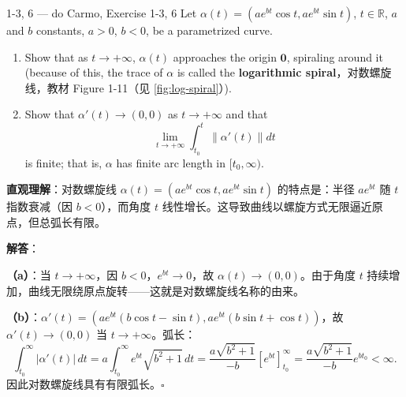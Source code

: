 \begin{exercise}{1-3, 6 — do Carmo, Exercise 1-3, 6}
Let $\alpha(t) = (ae^{bt}\cos t, ae^{bt}\sin t)$, $t \in \mathbb{R}$, $a$ and $b$ constants, $a > 0$, $b < 0$, be a parametrized curve.
\begin{enumerate}
\item[a.] Show that as $t \to +\infty$, $\alpha(t)$ approaches the origin $\mathbf{0}$, spiraling around it (because of this, the trace of $\alpha$ is called the \textbf{logarithmic spiral}，对数螺旋线，教材 Figure 1-11（见 \cref{fig:log-spiral}）).
\item[b.] Show that $\alpha'(t) \to (0,0)$ as $t \to +\infty$ and that
\[
\lim_{t \to +\infty} \int_{t_0}^t \|\alpha'(t)\| dt
\]
is finite; that is, $\alpha$ has finite arc length in $[t_0, \infty)$.
\end{enumerate}
\end{exercise}

\begin{solution}
\textbf{直观理解}：对数螺旋线 $\alpha(t) = (ae^{bt}\cos t, ae^{bt}\sin t)$ 的特点是：半径 $ae^{bt}$ 随 $t$ 指数衰减（因 $b<0$），而角度 $t$ 线性增长。这导致曲线以螺旋方式无限逼近原点，但总弧长有限。

\textbf{解答}：

\textbf{（a）}：当 $t \to +\infty$，因 $b < 0$，$e^{bt} \to 0$，故 $\alpha(t) \to (0, 0)$。由于角度 $t$ 持续增加，曲线无限绕原点旋转——这就是对数螺旋线名称的由来。

\textbf{（b）}：$\alpha'(t) = (ae^{bt}(b\cos t - \sin t), ae^{bt}(b\sin t + \cos t))$，故 $\alpha'(t) \to (0, 0)$ 当 $t \to +\infty$。弧长：
\[
\int_{t_0}^\infty |\alpha'(t)|\, dt = a\int_{t_0}^\infty e^{bt}\sqrt{b^2 + 1}\, dt = \frac{a\sqrt{b^2+1}}{-b}[e^{bt}]_{t_0}^\infty = \frac{a\sqrt{b^2+1}}{-b}e^{bt_0} < \infty.
\]
因此对数螺旋线具有有限弧长。$\square$
\end{solution}

